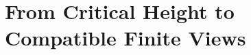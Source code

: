 \documentclass[12pt,oneside,letterpaper]{article}
\begin{document}
\setcounter{section}{1}

\section{From Critical Height to Compatible Finite Views}\label{sec:FromCriticalHeightToCompatibleFiniteViews}








\end{document}
